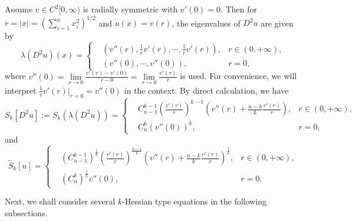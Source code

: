 \documentclass[a4paper,11pt]{amsart}
\theoremstyle{plain}
\theoremstyle{remark}
\numberwithin{equation}{section}
\numberwithin{figure}{section}
\numberwithin{remark}{section}
\begin{document}
\begin{sloppypar}
Assume $v\in C^2[0, \infty)$ is radially symmetric with $v'(0)=0$. Then for $r=|x|=(\sum\limits_{i=1}^n x_i^2)^{1/2}$ and  $u(x)=v(r)$, the eigenvalues of $D^2u$ are given by
	\begin{equation}\label{4.4}
	\lambda(D^2 u)(x) =
	\left\{
	\begin{aligned}
	& \left ( v''(r), \frac{1}{r}v'(r), \cdots, \frac{1}{r}v'(r) \right), & r\in (0, +\infty),\\
	& (v''(0), \cdots, v''(0)), & r=0,\ \ \ \ \  \ \ \  \
	\end{aligned}
	\right.
	\end{equation}
where $v''(0)=\lim\limits_{r\rightarrow 0} \frac{v'(r)-v'(0)}{r-0}=\lim\limits_{r\rightarrow 0} \frac{v'(r)}{r}$ is used. For convenience, we will interpret  $\frac{1}{r}v'(r)|_{r=0}=v''(0)$ in the context.
By direct calculation, we have
	\begin{equation}\label{4.5}
	S_k[D^2u]:= S_k(\lambda (D^2u)) =
	\left\{
	\begin{aligned}
	&C_{n-1}^{k-1}\left(\frac{v'(r)}{r}\right)^{k-1}\left(v''(r)+\frac{n-k}{k}\frac{v'(r)}{r}\right), & r\in (0, +\infty),\\
	& C_n^k (v''(0))^k, & r=0, \ \ \ \ \  \ \ \  \
	\end{aligned}
	\right.
	\end{equation}
and
	\begin{equation}\label{4.6}
	\tilde S_k[u] =
	\left\{
	\begin{aligned}
	&\left(C_{n-1}^{k-1}\right)^{\frac{1}{k}}\left(\frac{v'(r)}{r}\right)^{\frac{k-1}{k}}\left(v''(r)+\frac{n-k}{k}\frac{v'(r)}{r}\right)^\frac{1}{k}, & r\in (0, +\infty),\\
	& \left(C_n^k\right)^{\frac{1}{k}} v''(0), & r=0. \ \ \ \ \  \ \ \  \
	\end{aligned}
	\right.
	\end{equation}

Next, we shall consider several $k$-Hessian type equations in the following subsections. 


\end{sloppypar}
\end{document}
